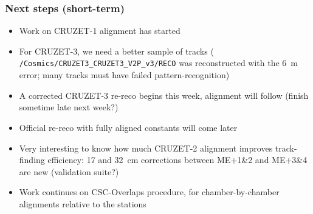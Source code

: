 \documentclass[compress]{beamer}
\begin{document}

\begin{frame}
\frametitle{Next steps (short-term)}

\begin{itemize}\setlength{\itemsep}{0.3 cm}
\item Work on CRUZET-1 alignment has started
\item For CRUZET-3, we need a better sample of tracks ({\scriptsize \tt
    /Cosmics/CRUZET3\_CRUZET3\_V2P\_v3/RECO} was reconstructed with the
  6~m error; many tracks must have failed pattern-recognition)
\item A corrected CRUZET-3 re-reco begins this week, alignment will follow (finish sometime late next week?)
\item Official re-reco with fully aligned constants will come later
\item Very interesting to know how much CRUZET-2 alignment improves
  track-finding efficiency: 17 and 32~cm corrections between ME+1\&2 and ME+3\&4 are new (validation suite?)
\item Work continues on CSC-Overlaps procedure, for chamber-by-chamber
  alignments relative to the stations
\end{itemize}

\label{numpages}
\end{frame}
\end{document}
